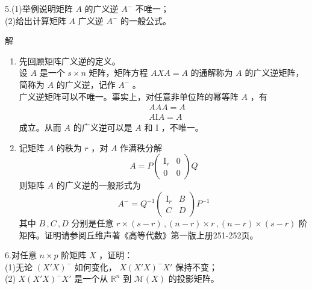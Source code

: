\documentclass[12pt,hyperref,]{ctexart}
\begin{document}
\vspace{3em}

\kaishu

5.(1)举例说明矩阵 \(A\) 的广义逆 \(A^-\) 不唯一；\\
(2)给出计算矩阵 \(A\) 广义逆 \(A^-\) 的一般公式。 \vspace{1em}

\heiti

解

\songti

\begin{enumerate}
\def\labelenumi{(\arabic{enumi})}
\item
  先回顾矩阵广义逆的定义。\\
  \fangsong 设 \(A\) 是一个 \(s\times n\) 矩阵，矩阵方程 \(AXA=A\)
  的通解称为 \(A\) 的广义逆矩阵，简称为 \(A\) 的广义逆，记作 \(A^{-}\)
  。\\
  \songti 广义逆矩阵可以不唯一。事实上，对任意非单位阵的幂等阵 \(A\)
  ，有 \begin{equation*}
  \begin{aligned}
  & AAA=A \\
  & A\mathrm{I}A=A
  \end{aligned}
  \end{equation*}成立。从而 \(A\) 的广义逆可以是 \(A\) 和 \(\mathrm{I}\)
  ，不唯一。
\item
  记矩阵 \(A\) 的秩为 \(r\) ，对 \(A\) 作满秩分解 \begin{equation*}
  A=P
  \begin{pmatrix}
  \mathrm{I}_r & 0 \\
  0 & 0
  \end{pmatrix}Q
  \end{equation*}则矩阵 \(A\) 的广义逆的一般形式为 \begin{equation*}
  A^-=Q^{-1}
  \begin{pmatrix}
  \mathrm{I}_r & B \\
  C & D 
  \end{pmatrix}P^{-1}
  \end{equation*}其中 \(B\, ,C\, ,D\) 分别是任意
  \(r\times (s-r)\, ,(n-r)\times r\, ,(n-r)\times (s-r)\)
  阶矩阵。证明请参阅丘维声著《高等代数》第一版上册251-252页。
\end{enumerate}

\vspace{3em}

\kaishu

6.对任意 \(n\times p\) 阶矩阵 \(X\) ，证明：\\
(1)无论 \((X'X)^-\) 如何变化， \(X(X'X)^-X'\) 保持不变；\\
(2) \(X(X'X)^-X'\) 是一个从 \(\mathbb{R}^n\) 到 \(\mathcal{M}(X)\)
的投影矩阵。 \vspace{1em}
\end{document}
